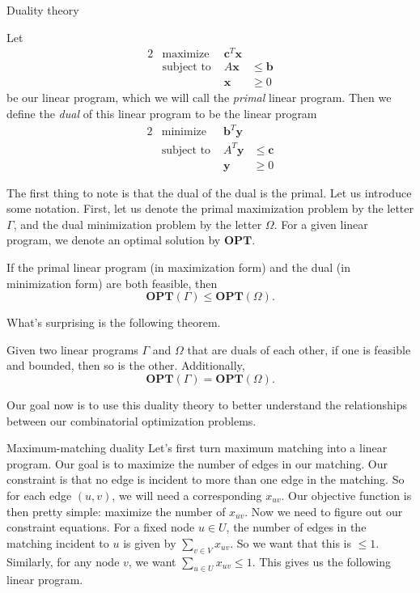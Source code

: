 \documentclass[11pt]{article}
\renewcommand{\'}{^{'}}
\newenvironment{theorem}[2][Theorem]{\begin{trivlist}
\item[\hskip \labelsep {\bfseries #1}\hskip \labelsep {\bfseries #2.}]}{\end{trivlist}}
\newenvironment{definition}[2][Definition]{\begin{trivlist}
\item[\hskip \labelsep {\bfseries #1}\hskip \labelsep {\bfseries #2.}]}{\end{trivlist}}
\begin{document}
\begin{section}{Duality theory}
\begin{definition}{(Dual)}
		Let 
		\begin{alignat*}{2}
			& \text{maximize } & \mathbf{c}^{T}\mathbf{x} \\
			& \text{subject to } & A\mathbf{x} & \leq \mathbf{b} \\
			&& \mathbf{x} &\geq 0
		\end{alignat*}
		be our linear program, which we will call the \emph{primal} linear program. Then we 
		define the \emph{dual} of this linear program to be the linear program
		\begin{alignat*}{2}
			& \text{minimize } & \mathbf{b}^{T}\mathbf{y} \\
			& \text{subject to } & A^{T}\mathbf{y} & \leq \mathbf{c} \\
			&& \mathbf{y} &\geq 0
		\end{alignat*}
	\end{definition}
	The first thing to note is that the dual of the dual is the primal. Let us introduce some 
	notation. First, let us denote the primal maximization problem by the letter $\Gamma$, and 
	the dual minimization problem by the letter $\Omega$. For a given linear program, we denote 
	an optimal solution by $\mathbf{OPT}$. 

	\begin{theorem}{(Weak duality)}
		If the primal linear program (in maximization form) and the dual (in minimization 
		form) are both feasible, then 
		\[
			\mathbf{OPT}(\Gamma) \leq \mathbf{OPT}(\Omega).
		\]
	\end{theorem}
	What's surprising is the following theorem.

	\begin{theorem}{(Strong duality)}
		Given two linear programs $\Gamma$ and $\Omega$ that are duals of each other, if one is 
		feasible and bounded, then so is the other. Additionally, 
		\[
			\mathbf{OPT}(\Gamma) = \mathbf{OPT}(\Omega).
		\]
	\end{theorem}
	Our goal now is to use this duality theory to better understand the relationships between 
	our combinatorial optimization problems.

\begin{subsection}{Maximum-matching duality}
	Let's first turn maximum matching into a linear program. Our goal is to maximize the number 
	of edges in our matching. Our constraint is that no edge is incident to more than one edge 
	in the matching. So for each edge $(u,v)$, we will need a corresponding $x_{uv}$. Our objective 
	function is then pretty simple: maximize the number of $x_{uv}$. Now we need to figure out 
	our constraint equations. For a fixed node $u\in U$, the number of edges in the matching 
	incident 
	to $u$ is given by $\sum_{v\in V} x_{uv}$. So we want that this is $\leq 1$. Similarly, for any 
	node $v$, we want $\sum_{u\in U} x_{uv} \leq 1$. This gives us the following linear program.


\end{subsection}
\end{section}
\end{document}
